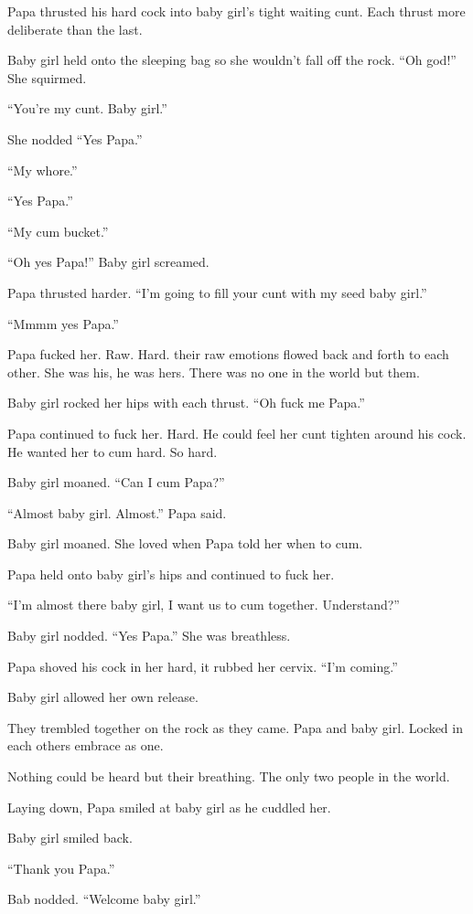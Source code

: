     Papa thrusted his hard cock into baby girl’s tight waiting cunt. Each thrust more deliberate than the last.

    Baby girl held onto the sleeping bag so she wouldn’t fall off the rock. “Oh god!” She squirmed.

    “You’re my cunt. Baby girl.”

    She nodded “Yes Papa.”

    “My whore.”

    “Yes Papa.”

    “My cum bucket.”

    “Oh yes Papa!” Baby girl screamed.

    Papa thrusted harder. “I’m going to fill your cunt with my seed baby girl.”

    “Mmmm yes Papa.”

    Papa fucked her. Raw. Hard. their raw emotions flowed back and forth to each other. She was his, he was hers. There was no one in the world but them.

    Baby girl rocked her hips with each thrust. “Oh fuck me Papa.”

    Papa continued to fuck her. Hard. He could feel her cunt tighten around his cock. He wanted her to cum hard. So hard.

    Baby girl moaned. “Can I cum Papa?”

    “Almost baby girl. Almost.” Papa said.

    Baby girl moaned. She loved when Papa told her when to cum.

    Papa held onto baby girl’s hips and continued to fuck her.

    “I’m almost there baby girl, I want us to cum together. Understand?”

    Baby girl nodded. “Yes Papa.” She was breathless.

    Papa shoved his cock in her hard, it rubbed her cervix. “I’m coming.”

    Baby girl allowed her own release.

    They trembled together on the rock as they came. Papa and baby girl. Locked in each others embrace as one.

    Nothing could be heard but their breathing. The only two people in the world.

    Laying down, Papa smiled at baby girl as he cuddled her.

    Baby girl smiled back.

    “Thank you Papa.”

    Bab nodded. “Welcome baby girl.”

